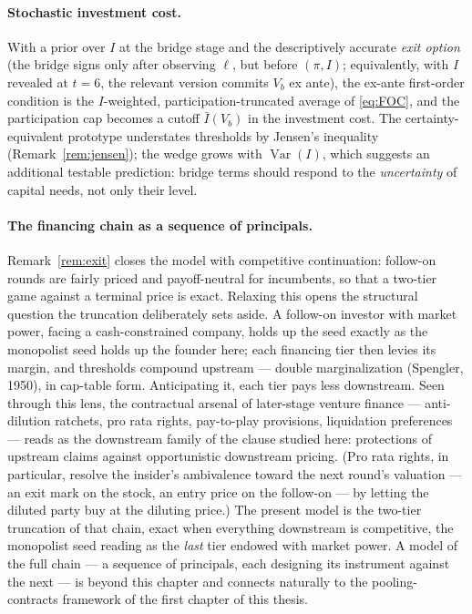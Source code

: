 \documentclass[11pt]{article}
\theoremstyle{definition}
\begin{document}
\paragraph{Stochastic investment cost.} With a prior over $I$ at the bridge stage and the descriptively accurate \emph{exit option} (the bridge signs only after observing $\ell$, but before $(\pi, I)$; equivalently, with $I$ revealed at $t=6$, the relevant version commits $V_b$ ex ante), the ex-ante first-order condition is the $I$-weighted, participation-truncated average of \eqref{eq:FOC}, and the participation cap becomes a cutoff $\bar I(V_b)$ in the investment cost. The certainty-equivalent prototype understates thresholds by Jensen's inequality (Remark~\ref{rem:jensen}); the wedge grows with $\operatorname{Var}(I)$, which suggests an additional testable prediction: bridge terms should respond to the \emph{uncertainty} of capital needs, not only their level.

\paragraph{The financing chain as a sequence of principals.}
Remark~\ref{rem:exit} closes the model with competitive continuation: follow-on rounds are fairly priced and payoff-neutral for incumbents, so that a two-tier game against a terminal price is exact. Relaxing this opens the structural question the truncation deliberately sets aside. A follow-on investor with market power, facing a cash-constrained company, holds up the seed exactly as the monopolist seed holds up the founder here; each financing tier then levies its margin, and thresholds compound upstream --- double marginalization (Spengler, 1950), in cap-table form. Anticipating it, each tier pays less downstream. Seen through this lens, the contractual arsenal of later-stage venture finance --- anti-dilution ratchets, pro rata rights, pay-to-play provisions, liquidation preferences --- reads as the downstream family of the clause studied here: protections of upstream claims against opportunistic downstream pricing. (Pro rata rights, in particular, resolve the insider's ambivalence toward the next round's valuation --- an exit mark on the stock, an entry price on the follow-on --- by letting the diluted party buy at the diluting price.) The present model is the two-tier truncation of that chain, exact when everything downstream is competitive, the monopolist seed reading as the \emph{last} tier endowed with market power. A model of the full chain --- a sequence of principals, each designing its instrument against the next --- is beyond this chapter and connects naturally to the pooling-contracts framework of the first chapter of this thesis.
\end{document}
